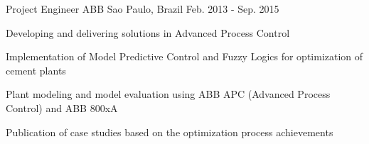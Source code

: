 \begin{cventries}
  \cventry
    {Project Engineer} %
    {ABB} %
    {Sao Paulo, Brazil} %
    {Feb. 2013 - Sep. 2015} %
    {
      \begin{cvitems} %
        \item {Developing and delivering solutions in Advanced Process Control}
        \item {Implementation of Model Predictive Control and Fuzzy Logics for optimization of cement plants}
        \item {Plant modeling and model evaluation using ABB APC (Advanced Process Control) and ABB 800xA}
        \item {Publication of case studies based on the optimization process achievements}
      \end{cvitems}
    }

\end{cventries}
